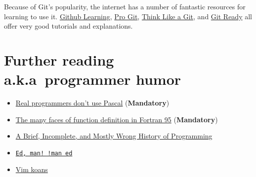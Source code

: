 \documentclass[openany,oneside]{report}
\newcommand{\Chapter}[2]{\chapter[#1]{#1\\[1ex]\Large#2}}
\begin{document}
Because of Git's popularity, the internet has a number of fantastic resources for learning to use it. \href{http://learn.Github.com/p/index.html}{Github Learning}, \href{http://git-scm.com/book}{Pro Git}, \href{http://think-like-a-git.net/}{Think Like a Git}, and \href{http://gitready.com/}{Git Ready} all offer very good tutorials and explanations.

\Chapter{Further reading}{a.k.a\ programmer humor}
\begin{itemize}
  \item \href{http://www.pbm.com/~lindahl/real.programmers.html}{Real programmers don't use Pascal} (\textbf{Mandatory})
  \item \href{https://gist.github.com/alanbriolat/3135713#file-fortran_hell-f95}{The many faces of function definition in Fortran 95} (\textbf{Mandatory})
  \item \href{http://james-iry.blogspot.com/2009/05/brief-incomplete-and-mostly-wrong.html}{A Brief, Incomplete, and Mostly Wrong History of Programming}
  \item \href{https://www.gnu.org/fun/jokes/ed-msg.html}{\texttt{Ed, man! !man ed}}
  \item \href{http://blog.sanctum.geek.nz/vim-koans/}{Vim koans}
\end{itemize}
\end{document}
